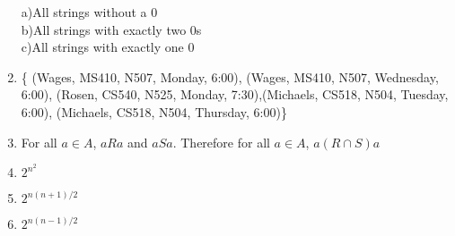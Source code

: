 \documentclass[11pt]{article}
\begin{document}
\begin{enumerate}
	a)All strings without a 0\\
	b)All strings with exactly two 0s\\
	c)All strings with exactly one 0\\
\item \{ (Wages, MS410, N507, Monday, 6:00), (Wages, MS410, N507, Wednesday, 6:00), (Rosen, CS540, N525, Monday, 7:30),(Michaels, CS518, N504, Tuesday, 6:00), (Michaels, CS518, N504, Thursday, 6:00)\}
\item For all $a \in A$, $aRa$ and $aSa$. Therefore for all $a \in A$, $a(R \cap S)a$
\item $2^{n^2}$
\item $2^{n(n+1)/2}$
\item $2^{n(n-1)/2}$
\end{enumerate}
\end{document}
